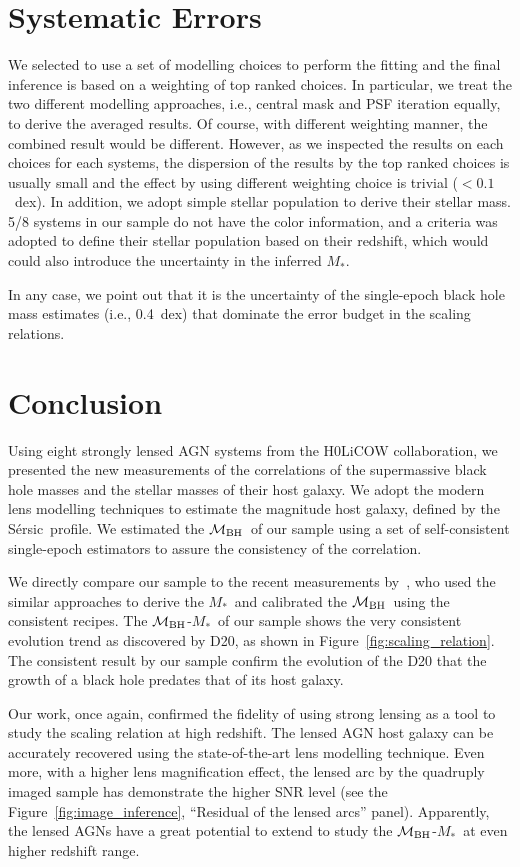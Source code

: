 \documentclass[fleqn,usenatbib]{mnras}
\newcommand{\mbh}{$\mathcal M_{\rm BH}$}
\newcommand{\sersic}{S\'ersic}
\newcommand{\mstar}{{$M_*$}}
\begin{document}
\section{Systematic Errors}\label{sec:diss}
We selected to use a set of modelling choices to perform the fitting and the final inference is based on a weighting of top ranked choices. In particular, we treat the two different modelling approaches, i.e., central mask and PSF iteration equally, to derive the averaged results. Of course, with different weighting manner, the combined result would be different. However, as we inspected the results on each choices for each systems, the dispersion of the results by the top ranked choices is usually small and the effect by using different weighting choice is trivial ($<0.1$~dex). In addition, we adopt simple stellar population to derive their stellar mass. 5/8 systems in our sample do not have the color information, and a criteria was adopted to define their stellar population based on their redshift, which would could also introduce the uncertainty in the inferred \mstar.

In any case, we point out that it is the uncertainty of the single-epoch black hole mass estimates (i.e., 0.4~dex) that dominate the error budget in the scaling relations. 

\section{Conclusion}\label{sec:con}
Using eight strongly lensed AGN systems from the H0LiCOW collaboration, we presented the new measurements of the correlations of the supermassive black hole masses and the stellar masses of their host galaxy. We adopt the modern lens modelling techniques to estimate the magnitude host galaxy, defined by the \sersic\ profile. We estimated the \mbh\ of our sample using a set of self-consistent single-epoch estimators to assure the consistency of the correlation.

We directly compare our sample to the recent measurements by~\citet[][D20]{Ding2020a}, who used the similar approaches to derive the \mstar\ and calibrated the \mbh\ using the consistent recipes. The \mbh-\mstar\ of our sample shows the very consistent evolution trend as discovered by D20, as shown in Figure~\ref{fig:scaling_relation}. The consistent result by our sample confirm the evolution of the D20 that the growth of a black hole predates that of its host galaxy.

Our work, once again, confirmed the fidelity of using strong lensing as a tool to study the scaling relation at high redshift. The lensed AGN host galaxy can be accurately recovered using the state-of-the-art lens modelling technique. Even more, with a higher lens magnification effect, the lensed arc by the quadruply imaged sample has demonstrate the higher SNR level (see the Figure~\ref{fig:image_inference}, ``Residual of the lensed arcs'' panel). Apparently, the lensed AGNs have a great potential  to extend to study the \mbh-\mstar\ at even higher redshift range. 
\end{document}
